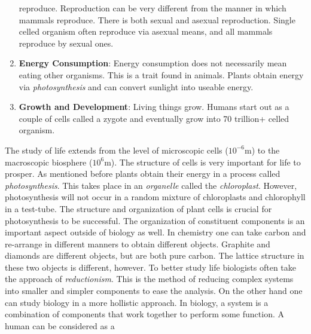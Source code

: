 \documentclass[crop=false,class=book,oneside]{standalone}
\begin{document}
\begin{enumerate}
                  reproduce. Reproduction can be very
                  different from the manner in which
                  mammals reproduce. There is both
                  sexual and asexual reproduction. Single
                  celled organism often reproduce via
                  asexual means, and all mammals
                  reproduce by sexual ones.
            \item \textbf{Energy Consumption}: Energy
                  consumption does not necessarily mean
                  eating other organisms. This is a
                  trait found in animals. Plants obtain
                  energy via
                  \textit{photosynthesis} and can convert
                  sunlight into useable energy.
            \item \textbf{Growth and Development}: Living
                  things grow. Humans start out as a
                  couple of cells called a zygote and
                  eventually grow into 70 trillion+
                  celled organism.
        \end{enumerate}
        The study of life extends from the level of
        microscopic cells ($10^{-6}\textrm{m}$) to the
        macroscopic biosphere ($10^{6}\textrm{m}$).
        The structure of cells is very important for
        life to prosper. As mentioned before plants
        obtain their energy in a process called
        \textit{photosynthesis}. This takes place
        in an \textit{organelle} called the
        \textit{chloroplast}. However,
        photosynthesis will not occur in a random
        mixture of chloroplasts and chlorophyll in
        a test-tube. The structure and organization of
        plant cells is crucial for photosynthesis to
        be successful. The organization of
        constituent components is an important aspect
        outside of biology as well. In chemistry one
        can take carbon and re-arrange in different manners
        to obtain different objects. Graphite and
        diamonds are different objects, but are both
        pure carbon. The lattice structure in these two
        objects is different, however. To better study
        life biologists often take the approach of
        \textit{reductionism}. This is the method of
        reducing complex systems into smaller and simpler
        components to ease the analysis. On the other hand
        one can study biology in a more hollistic approach.
        In biology, a system is a combination of
        components that work together to perform
        some function. A human can be considered as a
\end{document}
